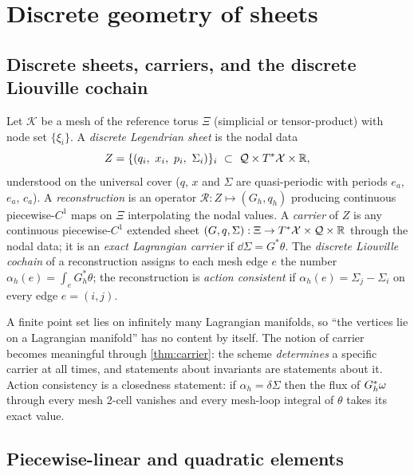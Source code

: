 \section{Discrete geometry of sheets}\label{sec:discrete}

\subsection{Discrete sheets, carriers, and the discrete Liouville cochain}

\begin{definition}\label{def:discrete}
Let $\mathcal K$ be a mesh of the reference torus $\Xi$ (simplicial or tensor-product) with node set $\{\xi_i\}$.
A \emph{discrete Legendrian sheet} is the nodal data
\begin{equation}\label{eq:state}
Z=\{(q_i,\ x_i,\ p_i,\ \Sigma_i)\}_i\ \subset\ \mathcal{Q}\times T^*\mathcal{X}\times\mathbb{R} ,
\end{equation}
understood on the universal cover ($q$, $x$ and $\Sigma$ are quasi-periodic with periods $e_a$, $e_a$, $c_a$).
A \emph{reconstruction} is an operator $\mathcal R:Z\mapsto(G_h,q_h)$ producing continuous piecewise-$C^1$ maps on
$\Xi$ interpolating the nodal values. A \emph{carrier} of $Z$ is any continuous piecewise-$C^1$ extended sheet
$(G,q,\Sigma):\Xi\to T^*\mathcal{X}\times\mathcal{Q}\times\mathbb{R}$ through the nodal data; it is an \emph{exact Lagrangian carrier} if
$\dd\Sigma=G^*\theta$. The \emph{discrete Liouville cochain} of a reconstruction assigns to each mesh edge $e$ the
number $\alpha_h(e)=\int_eG_h^*\theta$; the reconstruction is \emph{action consistent} if
$\alpha_h(e)=\Sigma_j-\Sigma_i$ on every edge $e=(i,j)$.
\end{definition}

A finite point set lies on infinitely many Lagrangian manifolds, so ``the vertices lie on a Lagrangian manifold''
has no content by itself. The notion of carrier becomes meaningful through \cref{thm:carrier}: the scheme
\emph{determines} a specific carrier at all times, and statements about invariants are statements about it.
Action consistency is a closedness statement: if $\alpha_h=\delta\Sigma$ then the flux of $G_h^*\omega$ through every
mesh 2-cell vanishes and every mesh-loop integral of $\theta$ takes its exact value.

\subsection{Piecewise-linear and quadratic elements}

